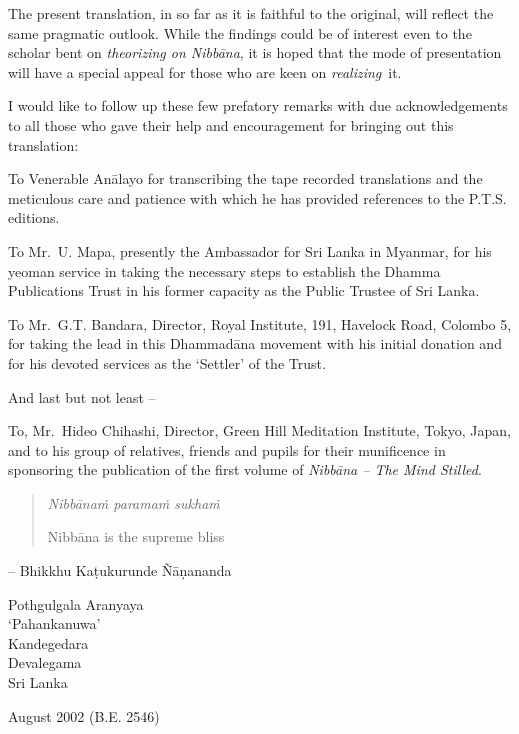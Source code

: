 The present translation, in so far as it is faithful to the original, will reflect the same pragmatic outlook. While the findings could be of interest even to the scholar bent on \emph{theorizing on Nibbāna}, it is hoped that the mode of presentation will have a special appeal for those who are keen on \emph{realizing}~it.

I would like to follow up these few prefatory remarks with due acknowledgements to all those who gave their help and encouragement for bringing out this translation:

To Venerable Anālayo for transcribing the tape recorded translations and the meticulous care and patience with which he has provided references to the P.T.S. editions.

To Mr.~U. Mapa, presently the Ambassador for Sri Lanka in Myanmar, for his yeoman service in taking the necessary steps to establish the Dhamma Publications Trust in his former capacity as the Public Trustee of Sri Lanka.

To Mr.~G.T. Bandara, Director, Royal Institute, 191, Havelock Road, Colombo 5, for taking the lead in this Dhammadāna movement with his initial donation and for his devoted services as the `Settler' of the Trust.

\clearpage

And last but not least --

To, Mr.~Hideo Chihashi, Director, Green Hill Meditation Institute, Tokyo, Japan, and to his group of relatives, friends and pupils for their munificence in sponsoring the publication of the first volume of \emph{Nibbāna -- The Mind Stilled}.

\begin{quote}
\emph{Nibbānaṁ paramaṁ sukhaṁ}

Nibbāna is the supreme bliss
\end{quote}

-- Bhikkhu Kaṭukurunde Ñāṇananda

Pothgulgala Aranyaya\\
`Pahankanuwa'\\
Kandegedara\\
Devalegama\\
Sri Lanka

August 2002 (B.E. 2546)
